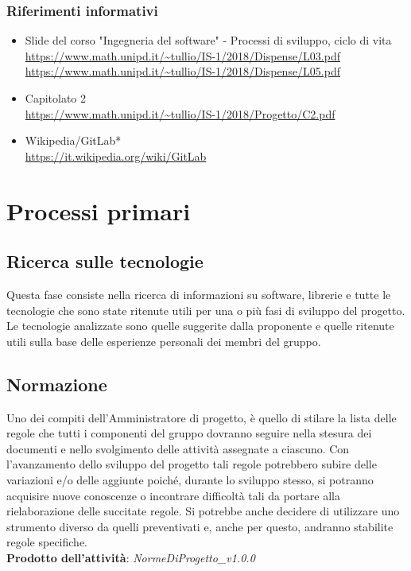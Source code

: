 \documentclass[11pt,a4paper]{article}
\begin{document}
	\subsubsection{Riferimenti informativi}
	\begin{itemize}
		\item Slide del corso "Ingegneria del software" - Processi di sviluppo, ciclo di vita \\
		\url {https://www.math.unipd.it/~tullio/IS-1/2018/Dispense/L03.pdf} \\
		\url {https://www.math.unipd.it/~tullio/IS-1/2018/Dispense/L05.pdf}
		\item Capitolato 2 \\
		\url {https://www.math.unipd.it/~tullio/IS-1/2018/Progetto/C2.pdf}
		\item Wikipedia/GitLab* \\
		\url {https://it.wikipedia.org/wiki/GitLab}
	\end{itemize}					
	\newpage
	
	\section{Processi primari}
	\subsection{Ricerca sulle tecnologie} 
	Questa fase consiste nella ricerca di informazioni su software, librerie e tutte le tecnologie che sono state ritenute utili per una o più fasi di sviluppo del progetto. Le tecnologie analizzate  sono quelle suggerite dalla proponente e quelle ritenute utili sulla base delle esperienze personali dei membri del gruppo. 
	
	
	\subsection{Normazione}
	Uno dei compiti dell'Amministratore di progetto, è quello di stilare la lista delle regole che tutti i componenti del gruppo dovranno seguire nella stesura dei documenti e nello svolgimento delle attività assegnate a ciascuno. Con l'avanzamento dello sviluppo del progetto tali regole potrebbero subire delle variazioni e/o delle aggiunte poiché, durante lo sviluppo stesso, si potranno acquisire nuove conoscenze o incontrare difficoltà tali da portare alla rielaborazione delle succitate regole. Si potrebbe anche decidere di utilizzare uno strumento diverso da quelli preventivati e, anche per questo, andranno stabilite regole specifiche.\\
	\textbf{Prodotto dell'attività}: \textit{NormeDiProgetto\_v1.0.0}
	
\end{document}

